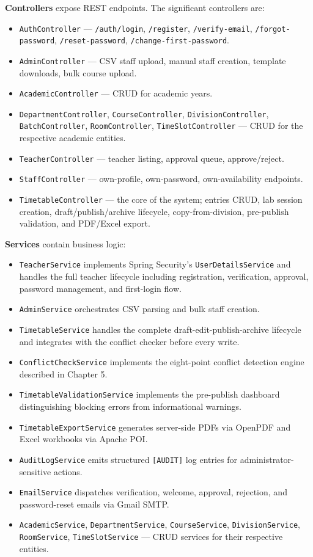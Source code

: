 \textbf{Controllers} expose REST endpoints. The significant controllers are:
\begin{itemize}
    \item \texttt{AuthController} --- \texttt{/auth/login}, \texttt{/register}, \texttt{/verify-email}, \texttt{/forgot-password}, \texttt{/reset-password}, \texttt{/change-first-password}.
    \item \texttt{AdminController} --- CSV staff upload, manual staff creation, template downloads, bulk course upload.
    \item \texttt{AcademicController} --- CRUD for academic years.
    \item \texttt{DepartmentController}, \texttt{CourseController}, \texttt{DivisionController}, \texttt{BatchController}, \texttt{RoomController}, \texttt{TimeSlotController} --- CRUD for the respective academic entities.
    \item \texttt{TeacherController} --- teacher listing, approval queue, approve/reject.
    \item \texttt{StaffController} --- own-profile, own-password, own-availability endpoints.
    \item \texttt{TimetableController} --- the core of the system; entries CRUD, lab session creation, draft/publish/archive lifecycle, copy-from-division, pre-publish validation, and PDF/Excel export.
\end{itemize}

\textbf{Services} contain business logic:
\begin{itemize}
    \item \texttt{TeacherService} implements Spring Security's \texttt{UserDetailsService} and handles the full teacher lifecycle including registration, verification, approval, password management, and first-login flow.
    \item \texttt{AdminService} orchestrates CSV parsing and bulk staff creation.
    \item \texttt{TimetableService} handles the complete draft-edit-publish-archive lifecycle and integrates with the conflict checker before every write.
    \item \texttt{ConflictCheckService} implements the eight-point conflict detection engine described in Chapter 5.
    \item \texttt{TimetableValidationService} implements the pre-publish dashboard distinguishing blocking errors from informational warnings.
    \item \texttt{TimetableExportService} generates server-side PDFs via OpenPDF and Excel workbooks via Apache POI.
    \item \texttt{AuditLogService} emits structured \texttt{[AUDIT]} log entries for administrator-sensitive actions.
    \item \texttt{EmailService} dispatches verification, welcome, approval, rejection, and password-reset emails via Gmail SMTP.
    \item \texttt{AcademicService}, \texttt{DepartmentService}, \texttt{CourseService}, \texttt{DivisionService}, \texttt{RoomService}, \texttt{TimeSlotService} --- CRUD services for their respective entities.
\end{itemize}

